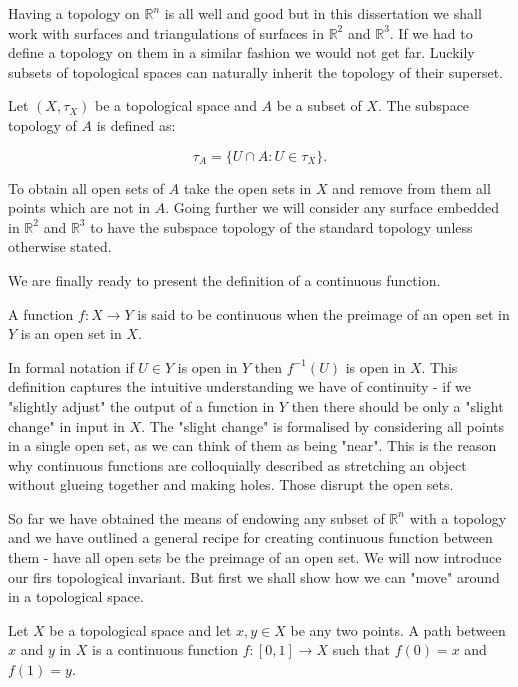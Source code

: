Having a topology on $\mathbb{R}^n$ is all well and good but in this dissertation we shall work with surfaces and triangulations of surfaces in $\mathbb{R}^2$ and $\mathbb{R}^3$. If we had to define a topology on them in a similar fashion we would not get far. Luckily subsets of topological spaces can naturally inherit the topology of their superset.

\begin{defn} Let $(X, \tau_X)$ be a topological space and $A$ be a subset of $X$. The subspace topology of $A$ is defined as: \end{defn}

$$ \tau_A = \{U \cap A: U \in \tau_X\}.$$

To obtain all open sets of $A$ take the open sets in $X$ and remove from them all points which are not in $A$. Going further we will consider any surface embedded in $\mathbb{R}^2$ and $\mathbb{R}^3$ to have the subspace topology of the standard topology unless otherwise stated.

We are finally ready to present the definition of a continuous function. 

\begin{defn} A function $f : X \to Y$ is said to be continuous when the preimage of an open set in $Y$ is an open set in $X$. \end{defn}

In formal notation if $U \in Y$ is open in $Y$ then $f^{-1}(U)$ is open in $X$. This definition captures the intuitive understanding we have of continuity - if we "slightly adjust" the output of a function in $Y$ then there should be only a "slight change" in input in $X$. The "slight change" is formalised by considering all points in a single open set, as we can think of them as being "near". This is the reason why continuous functions are colloquially described as stretching an object without glueing together and making holes. Those disrupt the open sets.

So far we have obtained the means of endowing any subset of $\mathbb{R}^n$ with a topology and we have outlined a general recipe for creating continuous function between them - have all open sets be the preimage of an open set. We will now introduce our firs topological invariant. But first we shall show how we can "move" around in a topological space. 

\begin{defn} Let $X$ be a topological space and let $x, y \in X$ be any two points. A path between $x$ and $y$ in $X$ is a continuous function $f: [0, 1] \to X$ such that $f(0) = x$ and $f(1) = y$.  \end{defn}

